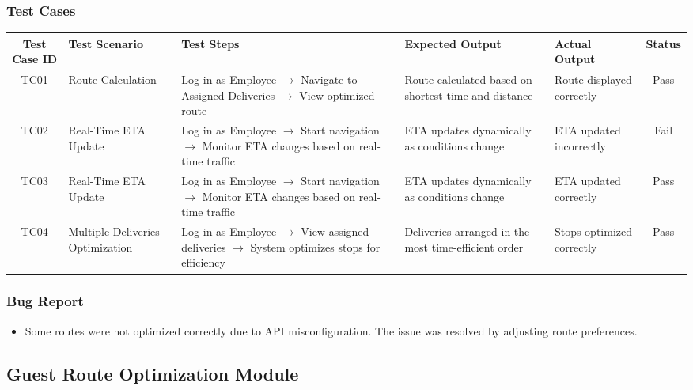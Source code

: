 \documentclass{article}
\begin{document}
\subsubsection{Test Cases}
\small
\setlength\LTleft{0pt}
\setlength\LTright{0pt}
\begin{longtable}{|c|p{2.8cm}|p{4cm}|p{2.8cm}|p{2.8cm}|c|}

\hline
\textbf{Test Case ID} & \textbf{Test Scenario} & \textbf{Test Steps} & \textbf{Expected Output} & \textbf{Actual Output} & \textbf{Status} \\
\hline
TC01 & Route Calculation & Log in as Employee $\rightarrow$ Navigate to Assigned Deliveries $\rightarrow$ View optimized route & Route calculated based on shortest time and distance & Route displayed correctly & Pass \\
\hline
TC02 & Real-Time ETA Update & Log in as Employee $\rightarrow$ Start navigation $\rightarrow$ Monitor ETA changes based on real-time traffic & ETA updates dynamically as conditions change & ETA updated incorrectly & Fail \\
\hline
TC03 & Real-Time ETA Update & Log in as Employee $\rightarrow$ Start navigation $\rightarrow$ Monitor ETA changes based on real-time traffic & ETA updates dynamically as conditions change & ETA updated correctly & Pass \\
\hline
TC04 & Multiple Deliveries Optimization & Log in as Employee $\rightarrow$ View assigned deliveries $\rightarrow$ System optimizes stops for efficiency & Deliveries arranged in the most time-efficient order & Stops optimized correctly & Pass \\
\hline
\end{longtable}

\subsubsection{Bug Report}
\begin{itemize}
\item Some routes were not optimized correctly due to API misconfiguration. The issue was resolved by adjusting route preferences.
\end{itemize}

\newpage
\subsection{Guest Route Optimization Module}
\end{document}
